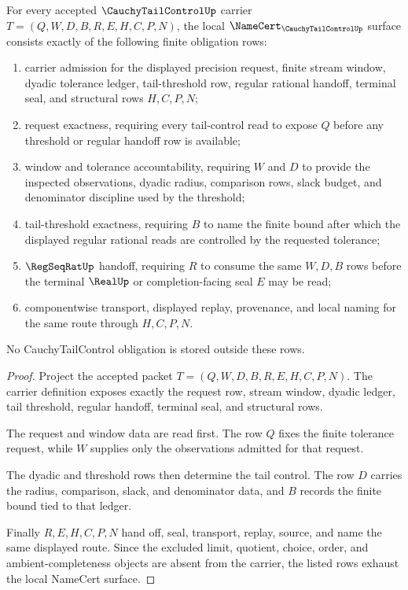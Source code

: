 \begin{theorem}
\label{thm:cauchy-tail-control-namecert-obligations}
For every accepted $\CauchyTailControlUp$ carrier $T=(Q,W,D,B,R,E,H,C,P,N)$, the local $\NameCert_{\CauchyTailControlUp}$ surface consists exactly of the following finite obligation rows:
\begin{enumerate}
\item carrier admission for the displayed precision request, finite stream window, dyadic tolerance ledger, tail-threshold row, regular rational handoff, terminal seal, and structural rows $H,C,P,N$;
\item request exactness, requiring every tail-control read to expose $Q$ before any threshold or regular handoff row is available;
\item window and tolerance accountability, requiring $W$ and $D$ to provide the inspected observations, dyadic radius, comparison rows, slack budget, and denominator discipline used by the threshold;
\item tail-threshold exactness, requiring $B$ to name the finite bound after which the displayed regular rational reads are controlled by the requested tolerance;
\item $\RegSeqRatUp$ handoff, requiring $R$ to consume the same $W,D,B$ rows before the terminal $\RealUp$ or completion-facing seal $E$ may be read;
\item componentwise transport, displayed replay, provenance, and local naming for the same route through $H,C,P,N$.
\end{enumerate}
No CauchyTailControl obligation is stored outside these rows.
\end{theorem}
\begin{proof}
Project the accepted packet $T=(Q,W,D,B,R,E,H,C,P,N)$. The carrier definition exposes exactly the request row, stream window, dyadic ledger, tail threshold, regular handoff, terminal seal, and structural rows.

The request and window data are read first. The row $Q$ fixes the finite tolerance request, while $W$ supplies only the observations admitted for that request.

The dyadic and threshold rows then determine the tail control. The row $D$ carries the radius, comparison, slack, and denominator data, and $B$ records the finite bound tied to that ledger.

Finally $R,E,H,C,P,N$ hand off, seal, transport, replay, source, and name the same displayed route. Since the excluded limit, quotient, choice, order, and ambient-completeness objects are absent from the carrier, the listed rows exhaust the local NameCert surface.
\end{proof}

